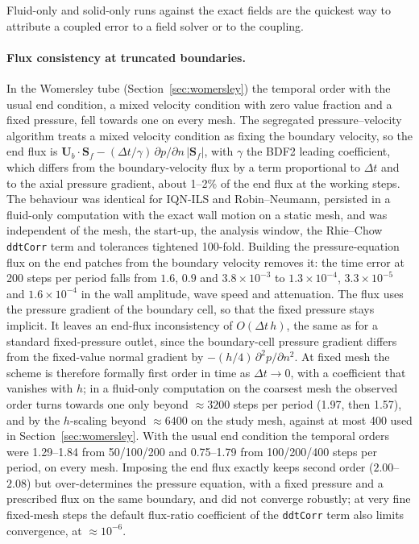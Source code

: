 Fluid-only and solid-only runs against the exact fields are the quickest way to attribute a coupled error to a field solver or to the coupling.

\paragraph{Flux consistency at truncated boundaries.}
In the Womersley tube (Section~\ref{sec:womersley}) the temporal order with the usual end condition, a mixed velocity condition with zero value fraction and a fixed pressure, fell towards one on every mesh.
The segregated pressure--velocity algorithm treats a mixed velocity condition as fixing the boundary velocity, so the end flux is $\mathbf{U}_b\cdot\mathbf{S}_f - (\Delta t/\gamma)\,\partial p/\partial n\,|\mathbf{S}_f|$, with $\gamma$ the BDF2 leading coefficient, which differs from the boundary-velocity flux by a term proportional to $\Delta t$ and to the axial pressure gradient, about 1--2\% of the end flux at the working steps.
The behaviour was identical for IQN-ILS and Robin--Neumann, persisted in a fluid-only computation with the exact wall motion on a static mesh, and was independent of the mesh, the start-up, the analysis window, the Rhie--Chow \texttt{ddtCorr} term and tolerances tightened 100-fold.
Building the pressure-equation flux on the end patches from the boundary velocity removes it: the time error at 200 steps per period falls from $1.6$, $0.9$ and $3.8\times10^{-3}$ to $1.3\times10^{-4}$, $3.3\times10^{-5}$ and $1.6\times10^{-4}$ in the wall amplitude, wave speed and attenuation.
The flux uses the pressure gradient of the boundary cell, so that the fixed pressure stays implicit.
It leaves an end-flux inconsistency of $O(\Delta t\,h)$, the same as for a standard fixed-pressure outlet, since the boundary-cell pressure gradient differs from the fixed-value normal gradient by $-(h/4)\,\partial^2 p/\partial n^2$.
At fixed mesh the scheme is therefore formally first order in time as $\Delta t\to0$, with a coefficient that vanishes with $h$; in a fluid-only computation on the coarsest mesh the observed order turns towards one only beyond $\approx3200$ steps per period (1.97, then 1.57), and by the $h$-scaling beyond $\approx6400$ on the study mesh, against at most 400 used in Section~\ref{sec:womersley}.
With the usual end condition the temporal orders were 1.29--1.84 from 50/100/200 and 0.75--1.79 from 100/200/400 steps per period, on every mesh.
Imposing the end flux exactly keeps second order ($2.00$--$2.08$) but over-determines the pressure equation, with a fixed pressure and a prescribed flux on the same boundary, and did not converge robustly; at very fine fixed-mesh steps the default flux-ratio coefficient of the \texttt{ddtCorr} term also limits convergence, at $\approx10^{-6}$.
